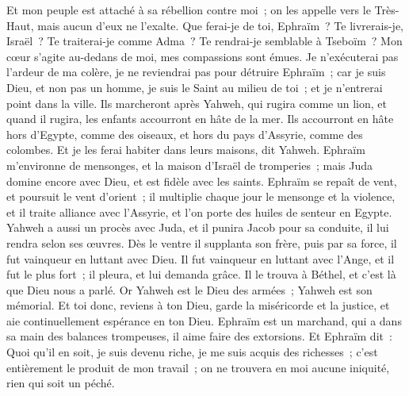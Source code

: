 \begin{multicols}{2}
Et mon peuple est attaché à sa rébellion contre moi~; on les appelle vers le Très-Haut, mais aucun d'eux ne l'exalte.
Que ferai-je de toi, Ephraïm~? Te livrerais-je, Israël~? Te traiterai-je comme Adma~? Te rendrai-je semblable à Tseboïm~? Mon cœur s'agite au-dedans de moi, mes compassions sont émues.
Je n'exécuterai pas l'ardeur de ma colère, je ne reviendrai pas pour détruire Ephraïm~; car je suis Dieu, et non pas un homme, je suis le Saint au milieu de toi~; et je n'entrerai point dans la ville.
Ils marcheront après Yahweh, qui rugira comme un lion, et quand il rugira, les enfants accourront en hâte de la mer.
Ils accourront en hâte hors d'Egypte, comme des oiseaux, et hors du pays d'Assyrie, comme des colombes. Et je les ferai habiter dans leurs maisons, dit Yahweh.
\VerseOne{}Ephraïm m'environne de mensonges, et la maison d'Israël de tromperies~; mais Juda domine encore avec Dieu, et est fidèle avec les saints.
Ephraïm se repaît de vent, et poursuit le vent d'orient~; il multiplie chaque jour le mensonge et la violence, et il traite alliance avec l'Assyrie, et l'on porte des huiles de senteur en Egypte.
Yahweh a aussi un procès avec Juda, et il punira Jacob pour sa conduite, il lui rendra selon ses œuvres.
Dès le ventre il supplanta son frère, puis par sa force, il fut vainqueur en luttant avec Dieu.
Il fut vainqueur en luttant avec l'Ange, et il fut le plus fort~; il pleura, et lui demanda grâce. Il le trouva à Béthel, et c'est là que Dieu nous a parlé.
Or Yahweh est le Dieu des armées~; Yahweh est son mémorial.
Et toi donc, reviens à ton Dieu, garde la miséricorde et la justice, et aie continuellement espérance en ton Dieu.
Ephraïm est un marchand, qui a dans sa main des balances trompeuses, il aime faire des extorsions.
Et Ephraïm dit~: Quoi qu'il en soit, je suis devenu riche, je me suis acquis des richesses~; c'est entièrement le produit de mon travail~; on ne trouvera en moi aucune iniquité, rien qui soit un péché.

\end{multicols}

